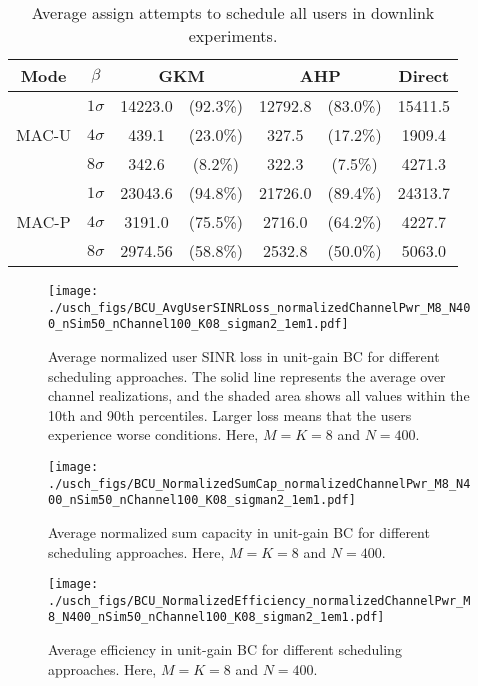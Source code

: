 \begin{table}[h]
	\centering    
	\caption{Average assign attempts to schedule all users in downlink experiments.}
	\label{tab:assign_attempts_mac_v}
	\begin{tabular}{c|c|cc|cc|c}
		Mode & $\beta$ & \multicolumn{2}{c|}{GKM} & \multicolumn{2}{c|}{AHP} & Direct \\\hline
		\multirow{3}{*}{MAC-U}
		& $1\sigma$ & 14223.0 &(92.3\%)  & 12792.8 &(83.0\%) & 15411.5   \\ \cline{2-7}
		& $4\sigma$ & 439.1 &(23.0\%) & 327.5 &(17.2\%)& 1909.4  \\ \cline{2-7}
		& $8\sigma$ & 342.6 &(8.2\%)  & 322.3 &(7.5\%) & 4271.3 \\ \hline
		\multirow{3}{*}{MAC-P}
		& $1\sigma$ & 23043.6 &(94.8\%) & 21726.0 &(89.4\%) & 24313.7  \\ \cline{2-7}
		& $4\sigma$ & 3191.0 &(75.5\%)  & 2716.0 &(64.2\%) & 4227.7  \\ \cline{2-7}
		& $8\sigma$ & 2974.56 &(58.8\%) & 2532.8 &(50.0\%) & 5063.0 \\ \hline
	\end{tabular}
\end{table}

\begin{figure}[tbp]
	\centering
	\texttt{[image: ./usch\_figs/BCU\_AvgUserSINRLoss\_normalizedChannelPwr\_M8\_N400\_nSim50\_nChannel100\_K08\_sigman2\_1em1.pdf]}
	\caption{Average normalized user SINR loss in unit-gain BC for different scheduling approaches. The solid line represents the average over channel realizations, and the shaded area shows all values within the 10th and 90th percentiles. Larger loss means that the users experience worse conditions. Here, $M=K=8$ and $N=400$.}
	\label{fig:BCU_sinrLoss_M8_N400}
\end{figure}
\begin{figure}[tbp]
	\centering
	\texttt{[image: ./usch\_figs/BCU\_NormalizedSumCap\_normalizedChannelPwr\_M8\_N400\_nSim50\_nChannel100\_K08\_sigman2\_1em1.pdf]}
	\caption{Average normalized sum capacity in unit-gain BC for different scheduling approaches. Here, $M=K=8$ and $N=400$.}
	\label{fig:BCU_sumcapacity_M8_N400}
\end{figure}
\begin{figure}[tbp]
	\centering
	\texttt{[image: ./usch\_figs/BCU\_NormalizedEfficiency\_normalizedChannelPwr\_M8\_N400\_nSim50\_nChannel100\_K08\_sigman2\_1em1.pdf]}
	\caption{Average efficiency in unit-gain BC for different scheduling approaches. Here, $M=K=8$ and $N=400$.}
	\label{fig:BCU_efficiency_M8_N400}
\end{figure}
